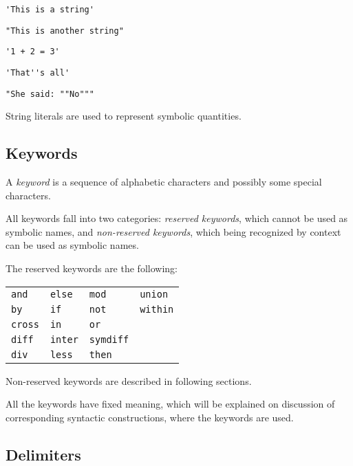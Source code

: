 \documentclass[10pt]{article}
\begin{document}
\medskip


\medskip

\noindent\verb|'This is a string'|

\noindent\verb|"This is another string"|

\noindent\verb|'1 + 2 = 3'|

\noindent\verb|'That''s all'|

\noindent\verb|"She said: ""No"""|

\medskip

String literals are used to represent symbolic quantities.

\subsection{Keywords}

A {\it keyword} is a sequence of alphabetic characters and possibly
some special characters.

All keywords fall into two categories: {\it reserved keywords}, which
cannot be used as symbolic names, and {\it non-reserved keywords},
which being recognized by context can be used as symbolic names.

\newpage

The reserved keywords are the following:

\medskip

\noindent\hfil
\begin{tabular}{@{}p{.7in}p{.7in}p{.7in}p{.7in}@{}}
{\tt and}&{\tt else}&{\tt mod}&{\tt union}\\
{\tt by}&{\tt if}&{\tt not}&{\tt within}\\
{\tt cross}&{\tt in}&{\tt or}\\
{\tt diff}&{\tt inter}&{\tt symdiff}\\
{\tt div}&{\tt less}&{\tt then}\\
\end{tabular}

\medskip

Non-reserved keywords are described in following sections.

All the keywords have fixed meaning, which will be explained on
discussion of corresponding syntactic constructions, where the keywords
are used.

\subsection{Delimiters}
\end{document}
